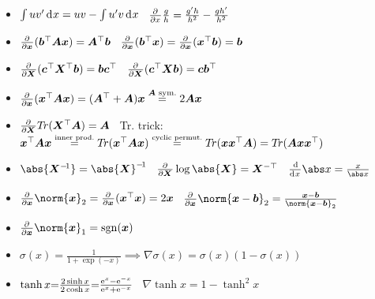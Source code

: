 \begin{itemize}
    \item $\int u v' \diff x = u v - \int u' v \diff x$
        \quad\textbullet\,
        $\pderiv{}{x} \frac{g}{h} = \frac{g'h}{h^2} - \frac{gh'}{h^2}$
    \item $\pderiv{}{\bm x} (\bm b^\top \bm{Ax}) = \bm A^\top \bm b$
        \quad\textbullet\,
        $\pderiv{}{\bm x} (\bm b^\top\bm  x) = \pderiv{}{\bm x} (\bm x^\top\bm  b) = \bm b$
    \item $\pderiv{}{\bm X} (\bm c^\top \bm X^\top \bm b) = \bm{bc}^\top$
        \quad\textbullet\,
        $\pderiv{}{\bm X} (\bm c^\top \bm{Xb}) = \bm{cb}^\top$
    \item $\pderiv{}{\bm x} (\bm x^\top \bm{Ax}) = (\bm A^\top + \bm A)\bm x \overset{\bm A\textrm{ sym.}}{=} 2\bm{Ax}$
    \item $\pderiv{}{\bm X} T\!r(\bm X^\top \bm A) = \bm A$
        \quad\textbullet\,
        Tr. trick: $\bm x^\top \bm{Ax} \overset{\small\substack{\textrm{inner prod.}}}{=} T\!r (\bm x^\top \bm{Ax}) \overset{\small\substack{\textrm{cyclic permut.}}}{=} T\!r(\bm{xx}^\top \bm A) = T\!r(\bm{Axx}^\top)$
    \item $\abs{\bm X^{-\!1}} = \abs{\bm X}^{-\!1}$
        \hfill\textbullet\,
        $\pderiv{}{\bm X} \log \abs{\bm X} = \bm X^{-\top}$
        \hfill\textbullet\,
        $\deriv{}{x} \abs x = \frac{x}{\abs x}$
    \item $\pderiv{}{\bm x} \norm{\bm x}_2 = \pderiv{}{\bm x} (\bm x^\top \bm x) = 2\bm x$
        \quad\textbullet\,
        $\pderiv{}{\bm x} \norm{\bm x - \bm b}_2 = \frac{\bm x-\bm b}{\norm{\bm x-\bm b}_2}$
    \item $\pderiv{}{\bm x} \norm{\bm x}_1 = \mathrm{sgn}(\bm x)$
    \item $\sigma(x) = \frac{1}{1 + \exp(-x)} \implies \nabla\sigma(x) = \sigma(x)(1-\sigma(x))$
    \item $\tanh x {=} \frac{2\sinh x}{2\cosh x} {=} \frac{\mathrm{e}^x - \mathrm{e}^{-x}}{\mathrm{e}^x+\mathrm{e}^{-x}}$
        \;\textbullet\,
        $\nabla\!\tanh x {=} 1\!-\tanh^2\! x$
\end{itemize}

